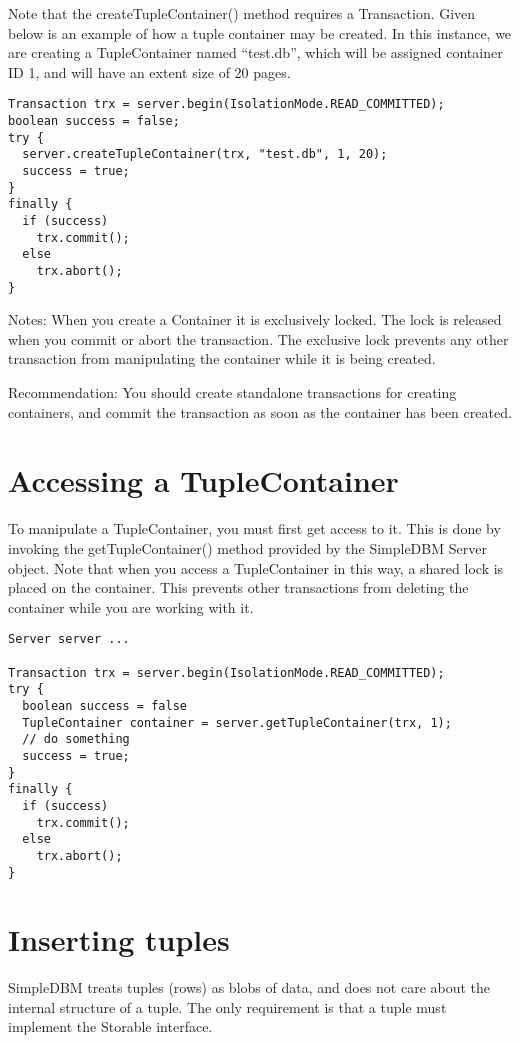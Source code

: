 \documentclass[a4paper,draft,oneside]{book}
\begin{document}
Note that the createTupleContainer() method requires a Transaction.
Given below is an example of how a tuple container may be created.
In this instance, we are creating a TupleContainer named ``test.db'', which
will be assigned container ID 1, and will have an extent size of 20 pages.

\begin{verbatim}
Transaction trx = server.begin(IsolationMode.READ_COMMITTED);
boolean success = false;
try {
  server.createTupleContainer(trx, "test.db", 1, 20);
  success = true;
}
finally {
  if (success)
    trx.commit();			
  else 
    trx.abort();
}
\end{verbatim}

Notes: When you create a Container it is exclusively locked. The lock
is released when you commit or abort the transaction. The exclusive lock
prevents any other transaction from manipulating the container while it is
being created.

Recommendation: You should create standalone transactions for creating
containers, and commit the transaction as soon as the container has been
created.

\section{Accessing a TupleContainer}

To manipulate a TupleContainer, you must first get access to it. This is
done by invoking the getTupleContainer() method provided by the SimpleDBM
Server object. Note that when you access a TupleContainer in this way, a shared
lock is placed on the container. This prevents other transactions from
deleting the container while you are working with it.

\begin{verbatim}
Server server ...

Transaction trx = server.begin(IsolationMode.READ_COMMITTED);
try {
  boolean success = false      
  TupleContainer container = server.getTupleContainer(trx, 1);
  // do something
  success = true;
}
finally {
  if (success)
    trx.commit();
  else
    trx.abort();
}
\end{verbatim}

\section{Inserting tuples}

SimpleDBM treats tuples (rows) as blobs of data, and does not care 
about the internal structure of a tuple. The only requirement is that
a tuple must implement the Storable interface.
\end{document}
